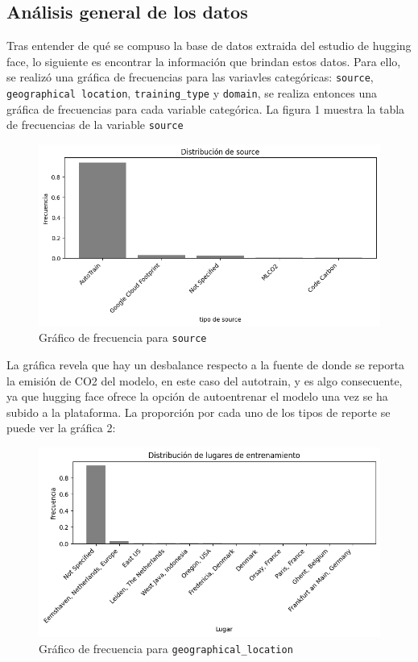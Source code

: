 \documentclass[journal]{IEEEtran}
\begin{document}
	\subsection{Análisis general de los datos}
	Tras entender de qué se compuso la base de datos extraida del estudio de hugging face, lo siguiente es encontrar la información que brindan estos datos. Para ello, se realizó una gráfica de frecuencias para las variavles categóricas: \texttt{source}, \texttt{geographical location}, \texttt{training\_type} y \texttt{domain}, se realiza entonces una gráfica de frecuencias para cada variable categórica. La figura 1 muestra la tabla de frecuencias de la variable \texttt{source}
	\begin{figure}[H]
		\centering
		\includegraphics[width=0.8\columnwidth]{assets/source_types.png}
		\caption{Gráfico de frecuencia para  \texttt{source}}
		\label{fig:pca_scatter}
	\end{figure}
	La gráfica revela que hay un desbalance respecto a la fuente de donde se reporta la emisión de CO2 del modelo, en este caso del autotrain, y es algo consecuente, ya que hugging face ofrece la opción de autoentrenar el modelo una vez se ha subido a la plataforma. La proporción por cada uno de los tipos de reporte se puede ver la gráfica 2: 
	\begin{figure}[H]
		\centering
		\includegraphics[width=0.8\columnwidth]{assets/places.png}
		\caption{Gráfico de frecuencia para  \texttt{geographical\_location}}
		\label{fig:pca_scatter}
	\end{figure}
\end{document}
